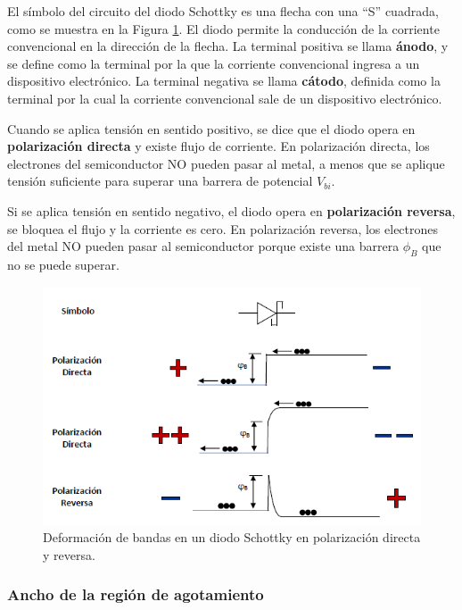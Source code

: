 El símbolo del circuito del diodo Schottky es una flecha con una ``S'' cuadrada, como se muestra en la Figura \ref{schottky1e}. El diodo permite la conducción de la corriente convencional en la dirección de la flecha. La terminal positiva se llama \textbf{ánodo}, y se define como la terminal por la que la corriente convencional ingresa a un dispositivo electrónico. La terminal negativa se llama \textbf{cátodo}, definida como la terminal por la cual la corriente convencional sale de un dispositivo electrónico.

Cuando se aplica tensión en sentido positivo, se dice que el diodo opera en \textbf{polarización directa} y existe flujo de corriente. En polarización directa, los electrones del semiconductor NO pueden pasar al metal, a menos que se aplique tensión suficiente para superar una barrera de potencial $V_{bi}$.

 Si se aplica tensión en sentido negativo, el diodo opera en \textbf{polarización reversa}, se bloquea el flujo y la corriente es cero. En polarización reversa, los electrones del metal NO pueden pasar al semiconductor porque existe una barrera $\phi_B$ que no se puede superar.
 

\begin{figure}[H]
    \centering
    \includegraphics{figuras/contacto_schottky_5.png}
    \caption{Deformación de bandas en un diodo Schottky en polarización directa y reversa.}
    \label{schottky1e}
\end{figure}


\newpage
\subsubsection{Ancho de la región de agotamiento}

